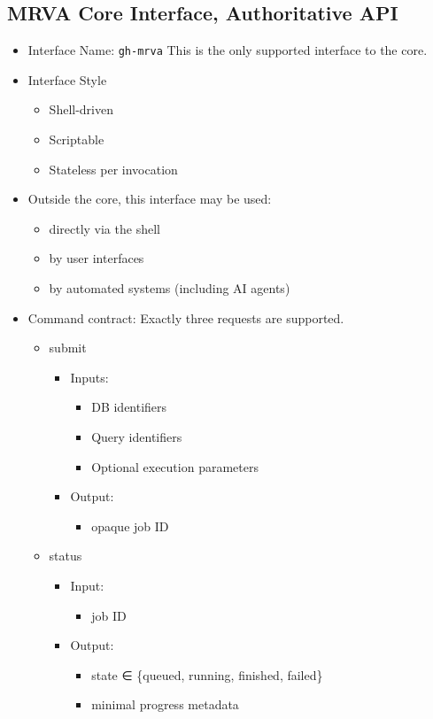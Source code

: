 \documentclass[11pt]{article}
\begin{document}
\subsection{MRVA Core Interface, Authoritative API}
\label{sec:orgb53e0dc}
\begin{itemize}
\item Interface Name: \texttt{gh-mrva}
This is the only supported interface to the core.

\item Interface Style
\begin{itemize}
\item Shell-driven
\item Scriptable
\item Stateless per invocation
\end{itemize}

\item Outside the core, this interface may be used:
\begin{itemize}
\item directly via the shell
\item by user interfaces
\item by automated systems (including AI agents)
\end{itemize}

\item Command contract:
Exactly three requests are supported.
\begin{itemize}
\item submit
\begin{itemize}
\item Inputs:
\begin{itemize}
\item DB identifiers
\item Query identifiers
\item Optional execution parameters
\end{itemize}
\item Output:
\begin{itemize}
\item opaque job ID
\end{itemize}
\end{itemize}

\item status
\begin{itemize}
\item Input:
\begin{itemize}
\item job ID
\end{itemize}
\item Output:
\begin{itemize}
\item state ∈ \{queued, running, finished, failed\}
\item minimal progress metadata
\end{itemize}
\end{itemize}


\end{itemize}
\end{itemize}
\end{document}
